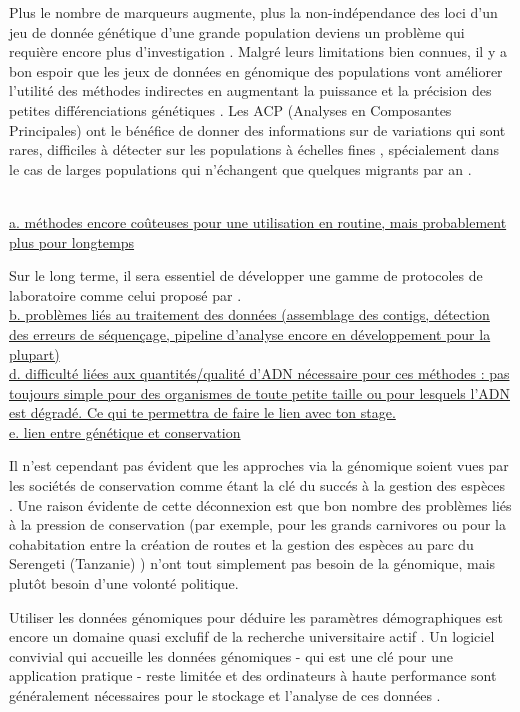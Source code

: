 \documentclass[a4paper,11pt,twoside]{report}
\begin{document}
Plus le nombre de marqueurs augmente, plus la non-indépendance des loci d'un jeu de donnée génétique d'une grande population deviens un problème qui requière encore plus d'investigation \citep{waples2014testing}. 
Malgré leurs limitations bien connues, il y a bon espoir que les jeux de données en génomique des populations vont améliorer l'utilité des méthodes indirectes en augmentant la puissance et la précision des petites différenciations génétiques \citep{Gagnaire:2015aa}. Les ACP (Analyses en Composantes Principales) ont le bénéfice de donner des informations sur de variations qui sont rares, difficiles à détecter sur les populations à échelles fines \citep{o2015rare}, spécialement dans le cas de larges populations qui n'échangent que quelques migrants par an \citep{Gagnaire:2015aa}. 	
	
	~~\\
	\underline{a. méthodes encore coûteuses pour une utilisation en routine, mais probablement plus pour longtemps}
	
	Sur le long terme, il sera essentiel de développer une gamme de protocoles de laboratoire comme celui proposé par \citet{zielinski2014development}.
	~~\\
	\underline{b. problèmes liés au traitement des données (assemblage des contigs, détection des erreurs de séquençage, pipeline d'analyse encore en développement pour la plupart)}
	~~\\

	\underline{d. difficulté liées aux quantités/qualité d'ADN nécessaire pour ces méthodes : pas toujours simple pour des organismes de toute petite taille ou pour lesquels l'ADN est dégradé. Ce qui te permettra de faire le lien avec ton stage.}
~~\\

\underline{e. lien entre génétique et conservation}

Il n'est cependant pas évident que les approches via la génomique soient vues par les sociétés de conservation comme étant la clé du succés à la gestion des espèces \cite{shafer2015genomics}. Une raison évidente de cette déconnexion est que bon nombre des problèmes liés à la pression de conservation (par exemple, pour les grands carnivores \cite{ripple2014status} ou pour la cohabitation entre la création de routes et la gestion des espèces au parc du Serengeti (Tanzanie) \cite{fyumagwa2013roads}) n'ont tout simplement pas besoin de la génomique, mais plutôt besoin d'une volonté politique. 

Utiliser les données génomiques pour déduire les paramètres démographiques est encore un domaine quasi exclufif de la recherche universitaire actif \cite{excoffier2013robust}\cite{pinho2010divergence}\cite{garner2015genomics}. Un logiciel convivial qui accueille les données génomiques - qui est une clé pour une application pratique - reste limitée \cite{pinho2010divergence}\cite{excoffier2005bayesian}\cite{cornuet2014diyabc} et des ordinateurs à haute performance sont généralement nécessaires pour le stockage et l'analyse de ces données \cite{shafer2015genomics}\cite{garner2015genomics}.
\end{document}
